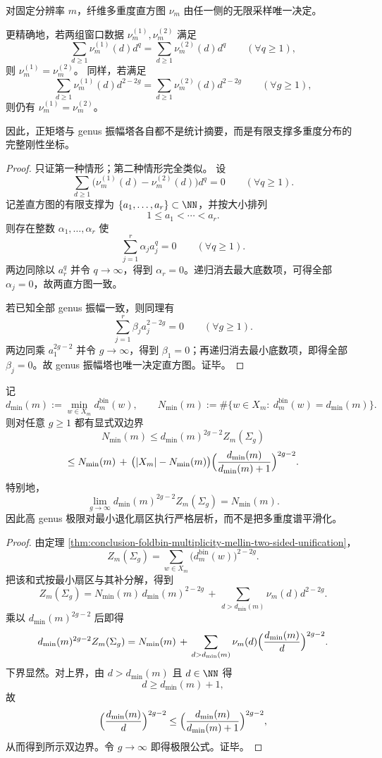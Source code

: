 \begin{theorem}\label{thm:conclusion-foldbin-multiplicity-mellin-finite-support-rigidity}
对固定分辨率 \(m\)，纤维多重度直方图 \(\nu_m\) 由任一侧的无限采样唯一决定。

更精确地，若两组窗口数据 \(\nu_m^{(1)},\nu_m^{(2)}\) 满足
\[
\sum_{d\ge 1}\nu_m^{(1)}(d)d^q
=
\sum_{d\ge 1}\nu_m^{(2)}(d)d^q
\qquad(\forall q\ge 1),
\]
则 \(\nu_m^{(1)}=\nu_m^{(2)}\)。
同样，若满足
\[
\sum_{d\ge 1}\nu_m^{(1)}(d)d^{2-2g}
=
\sum_{d\ge 1}\nu_m^{(2)}(d)d^{2-2g}
\qquad(\forall g\ge 1),
\]
则仍有 \(\nu_m^{(1)}=\nu_m^{(2)}\)。

因此，正矩塔与 genus 振幅塔各自都不是统计摘要，而是有限支撑多重度分布的完整刚性坐标。
\end{theorem}
\begin{proof}
只证第一种情形；第二种情形完全类似。
设
\[
\sum_{d\ge 1}\bigl(\nu_m^{(1)}(d)-\nu_m^{(2)}(d)\bigr)d^q=0
\qquad(\forall q\ge 1).
\]
记差直方图的有限支撑为 \(\{a_1,\dots,a_r\}\subset \NN\)，并按大小排列
\[
1\le a_1<\cdots<a_r.
\]
则存在整数 \(\alpha_1,\dots,\alpha_r\) 使
\[
\sum_{j=1}^r \alpha_j a_j^q=0
\qquad(\forall q\ge 1).
\]
两边同除以 \(a_r^q\) 并令 \(q\to\infty\)，得到 \(\alpha_r=0\)。递归消去最大底数项，可得全部 \(\alpha_j=0\)，故两直方图一致。

若已知全部 genus 振幅一致，则同理有
\[
\sum_{j=1}^r \beta_j a_j^{2-2g}=0
\qquad(\forall g\ge 1).
\]
两边同乘 \(a_1^{2g-2}\) 并令 \(g\to\infty\)，得到 \(\beta_1=0\)；再递归消去最小底数项，即得全部 \(\beta_j=0\)。故 genus 振幅塔也唯一决定直方图。证毕。
\end{proof}

\begin{theorem}\label{thm:conclusion-foldbin-highgenus-minsector-tomography}
记
\[
d_{\min}(m):=\min_{w\in X_m}d_m^{\mathrm{bin}}(w),
\qquad
N_{\min}(m):=\#\{w\in X_m:\ d_m^{\mathrm{bin}}(w)=d_{\min}(m)\}.
\]
则对任意 \(g\ge 1\) 都有显式双边界
\[
N_{\min}(m)
\le
d_{\min}(m)^{2g-2}Z_m(\Sigma_g)
\]
\[
\le
N_{\min}(m)
\,+\,
\bigl(|X_m|-N_{\min}(m)\bigr)
\Bigl(\frac{d_{\min}(m)}{d_{\min}(m)+1}\Bigr)^{2g-2}.
\]
特别地，
\[
\lim_{g\to\infty}d_{\min}(m)^{2g-2}Z_m(\Sigma_g)=N_{\min}(m).
\]
因此高 genus 极限对最小退化扇区执行严格层析，而不是把多重度谱平滑化。
\end{theorem}
\begin{proof}
由定理 \ref{thm:conclusion-foldbin-multiplicity-mellin-two-sided-unification}，
\[
Z_m(\Sigma_g)=\sum_{w\in X_m}\bigl(d_m^{\mathrm{bin}}(w)\bigr)^{2-2g}.
\]
把该和式按最小扇区与其补分解，得到
\[
Z_m(\Sigma_g)
=
N_{\min}(m)\,d_{\min}(m)^{2-2g}
\,+\,
\sum_{d>d_{\min}(m)} \nu_m(d)d^{2-2g}.
\]
乘以 \(d_{\min}(m)^{2g-2}\) 后即得
\[
d_{\min}(m)^{2g-2}Z_m(\Sigma_g)
=
N_{\min}(m)
\,+\,
\sum_{d>d_{\min}(m)}\nu_m(d)\Bigl(\frac{d_{\min}(m)}{d}\Bigr)^{2g-2}.
\]
下界显然。对上界，由 \(d>d_{\min}(m)\) 且 \(d\in \NN\) 得
\[
d\ge d_{\min}(m)+1,
\]
故
\[
\Bigl(\frac{d_{\min}(m)}{d}\Bigr)^{2g-2}
\le
\Bigl(\frac{d_{\min}(m)}{d_{\min}(m)+1}\Bigr)^{2g-2},
\]
从而得到所示双边界。令 \(g\to\infty\) 即得极限公式。证毕。
\end{proof}

